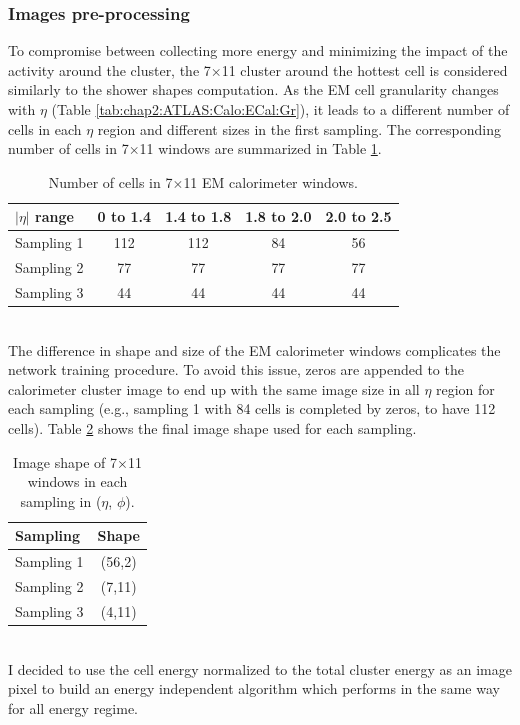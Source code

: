 \subsubsection{Images pre-processing}
\label{gamma:CNN:PreProcessing}
To compromise between collecting more energy and minimizing the impact of the activity around the cluster, the 7$\times$11 cluster around the hottest cell is considered similarly to the shower shapes computation. As the EM cell granularity changes with $\eta$ (Table \ref{tab:chap2:ATLAS:Calo:ECal:Gr}), it leads to a different number of cells in each $\eta$ region and different sizes in the first sampling. The corresponding number of cells in 7$\times$11 windows are summarized in Table \ref{tab:gamma:CNN:PreProcessing:NCells}.
\begin{table}[htbp]
    \centering
    \begin{tabular}{lcccc}
    \hline
        $|\eta|$ range & 0 to 1.4 & 1.4 to 1.8 & 1.8 to 2.0 & 2.0 to 2.5 \\
    \hline
        Sampling 1 & 112 & 112 & 84 & 56 \\
        Sampling 2 & 77 & 77 & 77 & 77 \\
        Sampling 3 & 44 & 44 & 44 & 44 \\
    \hline
    \end{tabular}
    \caption{Number of cells in 7$\times$11 EM calorimeter windows.}
    \label{tab:gamma:CNN:PreProcessing:NCells}
\end{table}
\\
The difference in shape and size of the EM calorimeter windows complicates the network training procedure. To avoid this issue, zeros are appended to the calorimeter cluster image to end up with the same image size in all $\eta$ region for each sampling (e.g., sampling 1 with 84 cells is completed by zeros, to have 112 cells). Table \ref{tab:gamma:CNN:PreProcessing:ImgSize} shows the final image shape used for each sampling.
\begin{table}[htbp]
    \centering
    \begin{tabular}{lc}
    \hline
        Sampling & Shape \\
    \hline
        Sampling 1 & (56,2)\\
        Sampling 2 & (7,11)  \\
        Sampling 3 & (4,11) \\
    \hline
    \end{tabular}
    \caption{Image shape of 7$\times$11 windows in each sampling in ($\eta$, $\phi$).}
    \label{tab:gamma:CNN:PreProcessing:ImgSize}
\end{table}
\\
I decided to use the cell energy normalized to the total cluster energy as an image pixel to build an energy independent algorithm which performs in the same way for all energy regime.

